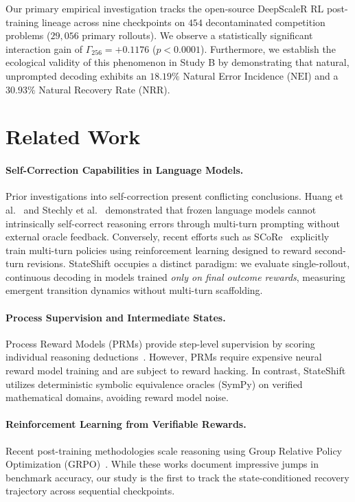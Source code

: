\documentclass{article}
\begin{document}
Our primary empirical investigation tracks the open-source DeepScaleR RL post-training lineage across nine checkpoints on $454$ decontaminated competition problems ($29,056$ primary rollouts). We observe a statistically significant interaction gain of $\Gamma_{256} = +0.1176$ ($p < 0.0001$). Furthermore, we establish the ecological validity of this phenomenon in Study B by demonstrating that natural, unprompted decoding exhibits an $18.19\%$ Natural Error Incidence ($\text{NEI}$) and a $30.93\%$ Natural Recovery Rate ($\text{NRR}$).

\section{Related Work}
\paragraph{Self-Correction Capabilities in Language Models.}
Prior investigations into self-correction present conflicting conclusions. Huang et al.~\cite{Huang2023Can} and Stechly et al.~\cite{Stechly2024Large} demonstrated that frozen language models cannot intrinsically self-correct reasoning errors through multi-turn prompting without external oracle feedback. Conversely, recent efforts such as SCoRe~\cite{Kumar2024Training} explicitly train multi-turn policies using reinforcement learning designed to reward second-turn revisions. StateShift occupies a distinct paradigm: we evaluate single-rollout, continuous decoding in models trained \emph{only on final outcome rewards}, measuring emergent transition dynamics without multi-turn scaffolding.

\paragraph{Process Supervision and Intermediate States.}
Process Reward Models (PRMs) provide step-level supervision by scoring individual reasoning deductions~\cite{Lightman2023Let, Uesato2022Solving}. However, PRMs require expensive neural reward model training and are subject to reward hacking. In contrast, StateShift utilizes deterministic symbolic equivalence oracles (SymPy) on verified mathematical domains, avoiding reward model noise.

\paragraph{Reinforcement Learning from Verifiable Rewards.}
Recent post-training methodologies scale reasoning using Group Relative Policy Optimization (GRPO)~\cite{Shao2024Deepseekmath, Luo2025Deepscaler}. While these works document impressive jumps in benchmark accuracy, our study is the first to track the state-conditioned recovery trajectory across sequential checkpoints.
\end{document}
